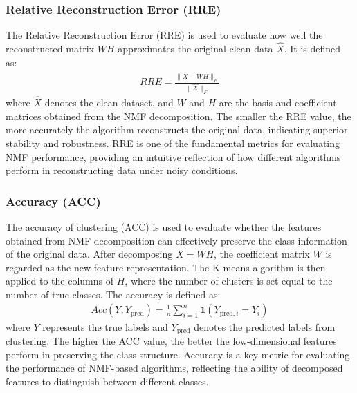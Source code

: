 \subsubsection{Relative Reconstruction Error (RRE)}
The Relative Reconstruction Error (RRE) is used to evaluate how well the reconstructed matrix $WH$ approximates the original clean data $\hat{X}$. It is defined as: 
\begin{align}
    RRE = \frac{\| \hat{X} - WH \|_F}{\| \hat{X} \|_F}
\end{align}
where $\hat{X}$ denotes the clean dataset, and $W$ and $H$ are the basis and coefficient matrices obtained from the NMF decomposition. The smaller the RRE value, the more accurately the algorithm reconstructs the original data, indicating superior stability and robustness. RRE is one of the fundamental metrics for evaluating NMF performance, providing an intuitive reflection of how different algorithms perform in reconstructing data under noisy conditions\cite{sohrabi2025graph}.

\subsubsection{Accuracy (ACC)}
The accuracy of clustering (ACC) is used to evaluate whether the features obtained from NMF decomposition can effectively preserve the class information of the original data. After decomposing $X = WH$, the coefficient matrix $W$ is regarded as the new feature representation. The K-means algorithm is then applied to the columns of $H$, where the number of clusters is set equal to the number of true classes. The accuracy is defined as:
\begin{align}
    Acc(Y, Y_{\text{pred}}) = \frac{1}{n} \sum_{i=1}^{n} \mathbf{1}(Y_{\text{pred}, i} = Y_i)
\end{align}
where $Y$ represents the true labels and $Y_{\text{pred}}$ denotes the predicted labels from clustering. The higher the ACC value, the better the low-dimensional features perform in preserving the class structure. Accuracy is a key metric for evaluating the performance of NMF-based algorithms, reflecting the ability of decomposed features to distinguish between different classes\cite{hedjam2021nmf}.

